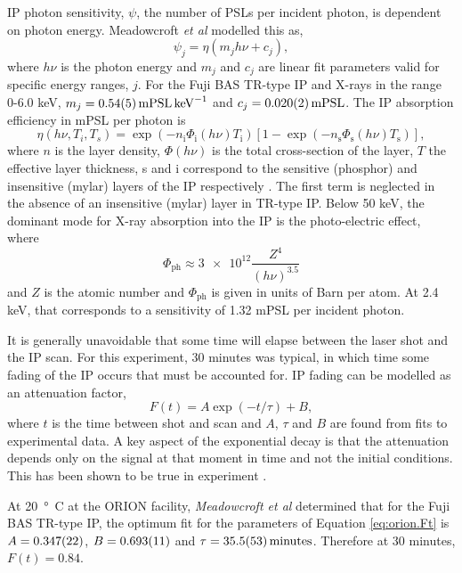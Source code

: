 IP photon sensitivity, $\psi$, the number of PSLs per incident photon, is dependent on photon energy. Meadowcroft \textit{et al} modelled this as,
\begin{equation}
	\psi_j = \eta(m_jh\nu + c_j),
\end{equation}
where $h\nu$ is the photon energy and $m_j$ and $c_j$ are linear fit parameters valid for specific energy ranges, $j$. For the Fuji BAS TR-type IP and X-rays in the range 0-6.0 keV, $m_j = \qty{0.54\pm0.05}{mPSL.keV^{-1}}$ and $c_j = \qty{0.02\pm0.002}{mPSL}$. The IP absorption efficiency in mPSL per photon is
\begin{equation}
	\eta(h\nu,T_i,T_s) = \exp{(-n_\mathrm{i}\Phi_\mathrm{i} (h\nu)T_\mathrm{i})}[1-\exp{(-n_\mathrm{s}\Phi_\mathrm{s}(h\nu)T_\mathrm{s})}],
\end{equation}
where $n$ is the layer density, $\Phi(h\nu)$ is the total cross-section of the layer, $T$ the effective layer thickness, s and i correspond to the sensitive (phosphor) and insensitive (mylar) layers of the IP respectively \cite{izumiApplicationImagingPlates2006}. The first term is neglected in the absence of an insensitive (mylar) layer in TR-type IP. Below 50 keV, the dominant mode for X-ray absorption into the IP is the photo-electric effect, where
\begin{equation}
	\Phi_\mathrm{ph} \approx \num{3e12}\frac{Z^4}{(h\nu)^{3.5}}   
\end{equation}
and $Z$ is the atomic number \cite{fornalskiSimpleEmpiricalCorrection2018} and $\Phi_\mathrm{ph}$ is given in units of Barn per atom. At 2.4 keV, that corresponds to a sensitivity of 1.32 mPSL per incident photon.

It is generally unavoidable that some time will elapse between the laser shot and the IP scan. For this experiment, 30 minutes was typical, in which time some fading of the IP occurs that must be accounted for. IP fading can be modelled as an attenuation factor,
\begin{equation}\label{eq:orion.Ft}
	F(t) = A\exp{(-t/\tau)} + B,
\end{equation}
where $t$ is the time between shot and scan and $A$, $\tau$ and $B$ are found from fits to experimental data. A key aspect of the exponential decay is that the attenuation depends only on the signal at that moment in time and not the initial conditions. This has been shown to be true in experiment \cite{meadowcroftEvaluationSensitivityFading2008}.

At \qty{20}{\degree C} at the ORION facility, \textit{Meadowcroft et al} \cite{meadowcroftEvaluationSensitivityFading2008} determined that for the Fuji BAS TR-type IP, the optimum fit for the parameters of Equation \ref{eq:orion.Ft} is $A = \num{0.347\pm0.022}$, $B = \num{0.693\pm0.011}$ and $\tau = \qty{35.5\pm5.3}{minutes}$. Therefore at 30 minutes, $F(t) = 0.84$.

